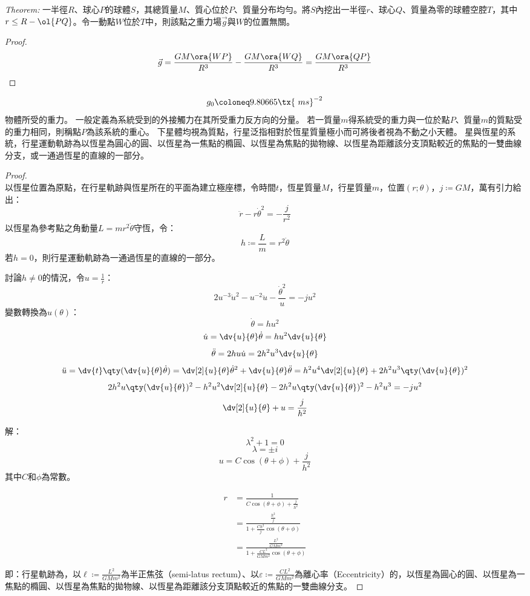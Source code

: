 \documentclass[a4paper,12pt]{article}
\begin{document}
\textit{Theorem:} 一半徑$R$、球心$P$的球體$S$，其總質量$M$、質心位於$P$、質量分布均勻。將$S$內挖出一半徑$r$、球心$Q$、質量為零的球體空腔$T$，其中$r\leq R-\ol{PQ}$。令一動點$W$位於$T$中，則該點之重力場$\vec{g}$與$W$的位置無關。
\begin{proof}
\[\vec{g}=\frac{GM\ora{WP}}{R^3}-\frac{GM\ora{WQ}}{R^3}=\frac{GM\ora{QP}}{R^3}\]
\end{proof}
\[g_0\coloneq 9.80665 \tx{\ m s}^{-2}\]
物體所受的重力。
一般定義為系統受到的外接觸力在其所受重力反方向的分量。
若一質量$m$得系統受的重力與一位於點$P$、質量$m$的質點受的重力相同，則稱點$P$為該系統的重心。
下星體均視為質點，行星泛指相對於恆星質量極小而可將後者視為不動之小天體。
星與恆星的系統，行星運動軌跡為以恆星為圓心的圓、以恆星為一焦點的橢圓、以恆星為焦點的拋物線、以恆星為距離該分支頂點較近的焦點的一雙曲線分支，或一通過恆星的直線的一部分。
\begin{proof}\mbox{}\\
以恆星位置為原點，在行星軌跡與恆星所在的平面為建立極座標，令時間$t$，恆星質量$M$，行星質量$m$，位置$(r;\theta)$，$j\coloneq GM$，萬有引力給出：
\[\ddot{r}-r\dot{\theta}^2=-\frac{j}{r^2}\]
以恆星為參考點之角動量$L=mr^2\dot{\theta}$守恆，令：
\[h\coloneq\frac{L}{m}=r^2\dot{\theta}\]
若$h=0$，則行星運動軌跡為一通過恆星的直線的一部分。

討論$h\neq0$的情況，令$u=\frac{1}{r}$：
\[2u^{-3}\dot{u}^2-u^{-2}\ddot{u}-\frac{\dot{\theta}^2}{u}=-ju^2\]
變數轉換為$u(\theta)$：
\[\dot{\theta}=h u^2\]
\[\dot{u}=\dv{u}{\theta}\dot{\theta}=h u^2\dv{u}{\theta}\]
\[\ddot{\theta}=2h u\dot{u}=2h^2u^3\dv{u}{\theta}\]
\[\ddot{u}=\dv{t}\qty(\dv{u}{\theta}\dot{\theta})=\dv[2]{u}{\theta}\dot{\theta}^2+\dv{u}{\theta}\ddot{\theta}=h^2u^4\dv[2]{u}{\theta}+2h^2u^3\qty(\dv{u}{\theta})^2\]
\[2h^2u\qty(\dv{u}{\theta})^2-h^2u^2\dv[2]{u}{\theta}-2h^2u\qty(\dv{u}{\theta})^2-h^2u^3=-ju^2\]
\[\dv[2]{u}{\theta}+u=\frac{j}{h^2}\]

解：
\[\lambda^2+1=0\]
\[\lambda=\pm i\]
\[u=C\cos(\theta+\phi)+\frac{j}{h^2}\]
其中$C$和$\phi$為常數。

\[\begin{aligned}
r&=\frac{1}{C\cos(\theta+\phi)+\frac{j}{h^2}}\\
&=\frac{\frac{h^2}{j}}{1+\frac{Ch^2}{j}\cos(\theta+\phi)}\\
&=\frac{\frac{L^2}{GMm^2}}{1+\frac{CL^2}{GMm^2}\cos(\theta+\phi)}
\end{aligned}\]

即：行星軌跡為，以$\ell\coloneq \frac{L^2}{GMm^2}$為半正焦弦（semi-latus rectum）、以$\varepsilon\coloneq \frac{CL^2}{GMm^2}$為離心率（Eccentricity）的，以恆星為圓心的圓、以恆星為一焦點的橢圓、以恆星為焦點的拋物線、以恆星為距離該分支頂點較近的焦點的一雙曲線分支。
\end{proof}
\end{document}
